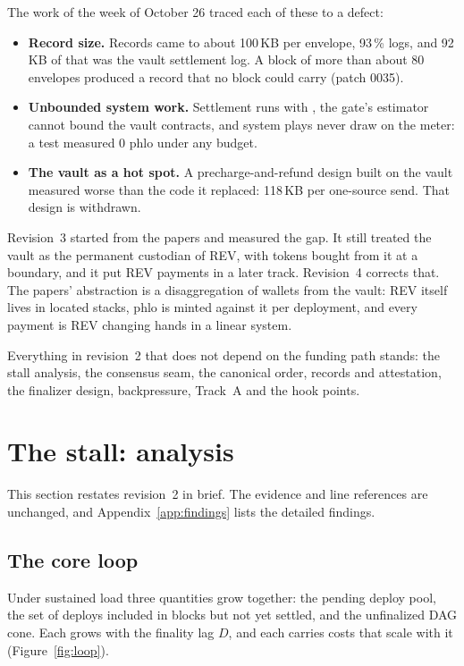 \documentclass[11pt]{article}
\newcommand{\code}{\path}
\begin{document}
The work of the week of October 26 traced each of these to a defect:
\begin{itemize}
\item \textbf{Record size.} Records came to about 100\,KB per envelope, 93\,\% logs, and 92\,KB of that was the vault settlement log. A block of more than about 80 envelopes produced a record that no block could carry (patch 0035).
\item \textbf{Unbounded system work.} Settlement runs with \code{Cost::unsafe_max()}, the gate's estimator cannot bound the vault contracts, and system plays never draw on the meter: a test measured 0 phlo under any budget.
\item \textbf{The vault as a hot spot.} A precharge-and-refund design built on the vault measured worse than the code it replaced: 118\,KB per one-source send. That design is withdrawn.
\end{itemize}

Revision~3 started from the papers and measured the gap. It still treated the vault as the permanent custodian of REV, with tokens bought from it at a boundary, and it put REV payments in a later track. Revision~4 corrects that. The papers' abstraction is a disaggregation of wallets from the vault: REV itself lives in located stacks, phlo is minted against it per deployment, and every payment is REV changing hands in a linear system.

Everything in revision~2 that does not depend on the funding path stands: the stall analysis, the consensus seam, the canonical order, records and attestation, the finalizer design, backpressure, Track~A and the hook points.
\section{The stall: analysis}\label{sec:analysis}

This section restates revision~2 in brief. The evidence and line references are unchanged, and Appendix~\ref{app:findings} lists the detailed findings.

\subsection{The core loop}

Under sustained load three quantities grow together: the pending deploy pool, the set of deploys included in blocks but not yet settled, and the unfinalized DAG cone. Each grows with the finality lag $D$, and each carries costs that scale with it (Figure~\ref{fig:loop}).
\end{document}
